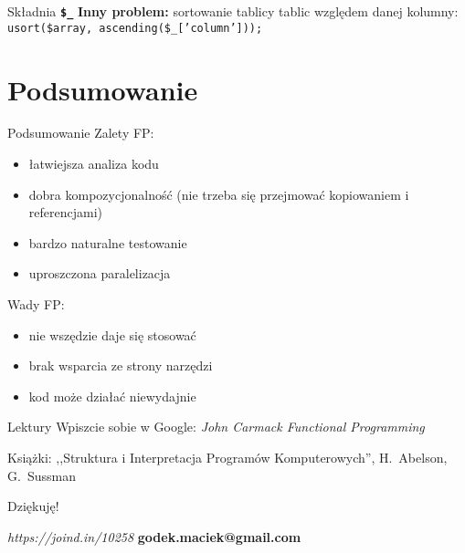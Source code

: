 \documentclass{beamer}
\newenvironment{tightcenter}{%
  \setlength\topsep{0pt}
  \setlength\parskip{0pt}
  \begin{center}
}{%
  \end{center}
}
\begin{document}
\begin{frame}{Składnia \textbf{\texttt{\$\_}}}
\textbf{Inny problem:} sortowanie tablicy tablic względem danej kolumny:\newline
\pause
\texttt{usort(\$array, ascending(\$\_['column']));}
\end{frame}

\section*{Podsumowanie}

\begin{frame}{Podsumowanie}
  \pause
  Zalety FP:
  \pause
  \begin{itemize}
  \item
    łatwiejsza analiza kodu
    \pause
  \item
    dobra kompozycjonalność (nie trzeba się przejmować kopiowaniem i referencjami)
    \pause
  \item
    bardzo naturalne testowanie
    \pause
  \item
    uproszczona paralelizacja
  \end{itemize}
  \pause
  Wady FP:
  \pause
  \begin{itemize}
  \item
    nie wszędzie daje się stosować
    \pause
  \item
    brak wsparcia ze strony narzędzi
    \pause
  \item
    kod może działać niewydajnie
  \end{itemize}
\end{frame}

\begin{frame}{Lektury}
  Wpiszcie sobie w Google: \newline
  \emph{John Carmack Functional Programming}\newline
  \newline \pause
  
  Książki: \newline
  ,,Struktura i Interpretacja Programów Komputerowych'', H.~Abelson, G.~Sussman
\end{frame}


\begin{frame}{Dziękuję!}
\begin{tightcenter}
\large{\emph{https://joind.in/10258}}\newline
\tiny{\textbf{godek.maciek@gmail.com}}
\end{tightcenter}
\end{frame}
\end{document}
